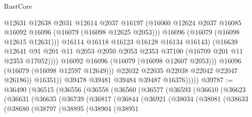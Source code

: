 \begin{lexlean}{RustCore}
\begin{coremodule}
                                  @12631
                                  @12638
                                  @2031
                                  @12614
                                  @2037
                                  @16197
                                  (@16060
                                    @12624
                                    @2037
                                    @16085
                                    @16092
                                    @16096
                                    (@16079 (@16098 @12625 @2053)))
                                  @16096
                                  (@16079 (@16098 @12615 @12631)))
                                @16114
                                @16118
                                @16123
                                @16128
                                @16134
                                @16143)
                              (@16639
                                @12641
                                @91
                                @201
                                @11
                                @2053
                                @2050
                                @2053
                                @2353
                                @37100
                                (@16709 @201 @11 @2353 @17052))))
                          @16092
                          @16096
                          (@16079 (@16098 @12607 @2053)))
                        @16096
                        (@16079 (@16098 @12597 @12649)))
                      @22032
                      @22035
                      @22038
                      @22042
                      @22047
                      @26186))
                  @16351))
              @39478
              @39481
              @39484
              @39487
              @16376)))))
@39787 := @36490
    (@36515
      (@36556
        (@36558
          (@36560
            (@36577
              (@36593
                (@36610
                  (@36623
                    (@36631
                      (@36635
                        (@36739
                          (@36817
                            (@36844
                              (@36921
                                (@38034
                                  (@38081
                                    (@38633
                                      (@38680
                                        (@38797
                                          (@38895
                                            (@38904
                                              (@38951

\end{coremodule}
\end{lexlean}
